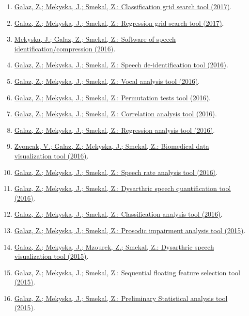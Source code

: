 \begin{enumerate}
	\item \href{http://splab.cz/en/download/software/software-pro-optimalizaci-klasifikacni-analyzy}{Galaz, Z.; Mekyska, J.; Smekal, Z.: Classification grid search tool (2017)}.
	\item \href{http://splab.cz/en/download/software/software-pro-optimalizaci-regresni-analyzy}{Galaz, Z.; Mekyska, J.; Smekal, Z.: Regression grid search tool (2017)}.
	\item \href{http://splab.cz/en/download/software/software-pro-identifikaci-a-kompresi-reci}{Mekyska, J.; Galaz, Z.; Smekal, Z.: Software of speech identification/compression (2016)}.
	\item \href{http://splab.cz/en/download/software/software-pro-de-identifikaci-reci}{Galaz, Z.; Mekyska, J.; Smekal, Z.: Speech de-identification tool (2016)}.
	\item \href{http://splab.cz/en/download/software/software-pro-analyzu-fonace}{Galaz, Z.; Mekyska, J.; Smekal, Z.: Vocal analysis tool (2016)}.
	\item \href{http://splab.cz/en/download/software/software-pro-permutacni-testy}{Galaz, Z.; Mekyska, J.; Smekal, Z.: Permutation tests tool (2016)}.
	\item \href{http://splab.cz/en/download/software/software-pro-korelacni-analyzu}{Galaz, Z.; Mekyska, J.; Smekal, Z.: Correlation analysis tool (2016)}.
	\item \href{http://splab.cz/en/download/software/software-pro-regresni-analyzu}{Galaz, Z.; Mekyska, J.; Smekal, Z.: Regression analysis tool (2016)}.
	\item \href{http://splab.cz/en/download/software/software-pro-vizualizaci-biomedicinskych-dat}{Zvoncak, V.; Galaz, Z.; Mekyska, J.; Smekal, Z.: Biomedical data visualization tool (2016)}.
	\item \href{http://splab.cz/en/download/software/software-pro-analyzu-tempa-reci}{Galaz, Z.; Mekyska, J.; Smekal, Z.: Speech rate analysis tool (2016)}.
	\item \href{http://splab.cz/en/download/software/software-pro-kvantifikaci-dyzartricke-reci}{Galaz, Z.; Mekyska, J.; Smekal, Z.: Dysarthric speech quantification tool (2016)}.
	\item \href{http://splab.cz/en/download/software/software-pro-klasifikacni-analyzu}{Galaz, Z.; Mekyska, J.; Smekal, Z.: Classification analysis tool (2016)}.
	\item \href{http://splab.cz/en/download/software/software-pro-analyzu-prozodickych-vad}{Galaz, Z.; Mekyska, J.; Smekal, Z.: Prosodic impairment analysis tool (2015)}.
	\item \href{http://splab.cz/en/download/software/software-pro-vizualizaci-dyzartricke-reci}{Galaz, Z.; Mekyska, J.; Mzourek, Z.; Smekal, Z.: Dysarthric speech visualization tool (2015)}.
	\item \href{http://splab.cz/en/download/software/software-pro-sekvencni-selekci-priznaku}{Galaz, Z.; Mekyska, J.; Smekal, Z.: Sequential floating feature selection tool (2015)}.
	\item \href{http://splab.cz/en/download/software/software-pro-predbeznou-statistickou-analyzu}{Galaz, Z.; Mekyska, J.; Smekal, Z.: Preliminary Statistical analysis tool (2015)}.
\end{enumerate}